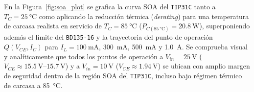 En la Figura~\ref{fig:soa_plot} se grafica la curva SOA del \texttt{TIP31C} tanto a $T_C = \SI{25}{\celsius}$ como aplicando la reducción térmica (\emph{derating}) para una temperatura de carcasa realista en servicio de $T_C = \SI{85}{\celsius}$ ($P_{C(\SI{85}{\celsius})} = \SI{20,8}{\watt}$), superponiendo además el límite del \texttt{BD135-16} y la trayectoria del punto de operación $Q(V_{CE}, I_C)$ para $I_L = \SI{100}{\milli\ampere}$, \SI{300}{\milli\ampere}, \SI{500}{\milli\ampere} y \SI{1,0}{\ampere}. Se comprueba visual y analíticamente que todos los puntos de operación a $V_{in} = \SI{25}{\volt}$ ($V_{CE} \approx \SI{15,5}{\volt}\text{--}\SI{15,7}{\volt}$) y a $V_{in} = \SI{10}{\volt}$ ($V_{CE} \approx \SI{1,94}{\volt}$) se ubican con amplio margen de seguridad dentro de la región SOA del \texttt{TIP31C}, incluso bajo régimen térmico de carcasa a \SI{85}{\celsius}.

